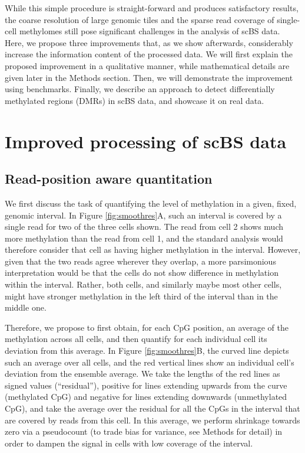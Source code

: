 \documentclass[twocolumn,10pt]{article}
\begin{document}
While this simple procedure is straight-forward and produces satisfactory results, the coarse resolution of large genomic tiles and the sparse read coverage of single-cell methylomes still pose significant challenges in the analysis of scBS data.
Here, we propose three improvements that, as we show afterwards, considerably increase the information content of the processed data.
We will first explain the proposed improvement in a qualitative manner, while mathematical details are given later in the Methods section.
Then, we will demonstrate the improvement using benchmarks.
Finally, we describe an approach to detect differentially methylated regions (DMRs) in scBS data, and showcase it on real data.

\section{Improved processing of scBS data}

\subsection{Read-position aware quantitation} \label{residuals}

We first discuss the task of quantifying the level of methylation in a given, fixed, genomic interval.
In Figure \ref{fig:smoothres}A, such an interval is covered by a single read for two of the three cells shown.
The read from cell 2 shows much more methylation than the read from cell 1, and the standard analysis would therefore consider that cell as having higher methylation in the interval.
However, given that the two reads agree wherever they overlap, a more parsimonious interpretation would be that the cells do not show difference in methylation within the interval.
Rather, both cells, and similarly maybe most other cells, might have stronger methylation in the left third of the interval than in the middle one.

Therefore, we propose to first obtain, for each CpG position, an average of the methylation across all cells, and then quantify for each individual cell its deviation from this average.
In Figure \ref{fig:smoothres}B, the curved line depicts such an average over all cells, and the red vertical lines show an individual cell's deviation from the ensemble average.
We take the lengths of the red lines as signed values (``residual''), positive for lines extending upwards from the curve (methylated CpG) and negative for lines extending downwards (unmethylated CpG), and take the average over the residual for all the CpGs in the interval that are covered by reads from this cell.
In this average, we perform shrinkage towards zero via a pseudocount (to trade bias for variance, see Methods for detail) in order to dampen the signal in cells with low coverage of the interval.
\end{document}
